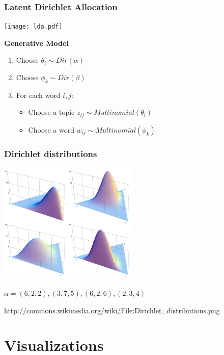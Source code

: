 \documentclass[t]{beamer}
\begin{document}
\begin{frame}
\frametitle{Latent Dirichlet Allocation}

\texttt{[image: lda.pdf]}
\bigskip

\textbf{Generative Model}
\begin{enumerate}
\item Choose $\theta_i \sim Dir(\alpha)$
\pause
\item Choose $\phi_k \sim Dir(\beta)$
\pause
\item For each word $i, j$:
    \begin{itemize}
    \item Choose a topic $z_{ij} \sim Multinomial(\theta_i)$
    \item Choose a word $w_{ij} \sim Multinomial(\phi_k)$
    \end{itemize}
\end{enumerate}

\cite{Blei2003}
\end{frame}

\begin{frame}
\frametitle{Dirichlet distributions}
\includegraphics[width=0.5\textwidth]{img/dirichlet.png}

$\alpha = (6,2,2), (3,7,5), (6,2,6), (2,3,4)$

\url{http://commons.wikimedia.org/wiki/File:Dirichlet\_distributions.png}
\end{frame}
\section{Visualizations}
\end{document}
